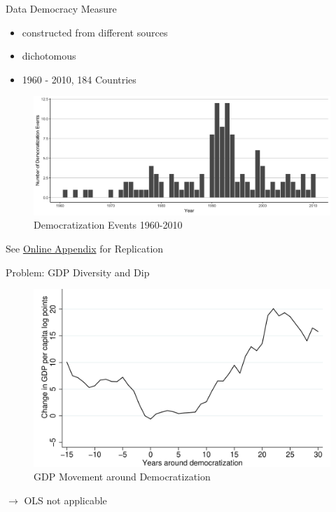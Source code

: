 \documentclass[
  ignorenonframetext,
]{beamer}
\providecommand{\tightlist}{%
  \setlength{\itemsep}{0pt}\setlength{\parskip}{0pt}}\usepackage{longtable,booktabs,array}
\begin{document}
\begin{frame}{Data}
\protect\hypertarget{data}{}
Democracy Measure

\begin{itemize}
\tightlist
\item
  constructed from different sources
\item
  dichotomous
\item
  1960 - 2010, 184 Countries
\end{itemize}

\begin{figure}

{\centering \includegraphics{output/figureDem.png}

}

\caption{Democratization Events 1960-2010}

\end{figure}

See
\href{https://skriptum.github.io/DDCG/vortrag/4-Figure2.html\#plot}{Online
Appendix} for Replication
\end{frame}

\begin{frame}{Problem: GDP Diversity and Dip}
\protect\hypertarget{problem-gdp-diversity-and-dip}{}
\begin{figure}

{\centering \includegraphics{output/FigureDip.png}

}

\caption{GDP Movement around Democratization}

\end{figure}

\(\to\) OLS not applicable
\end{frame}
\end{document}
